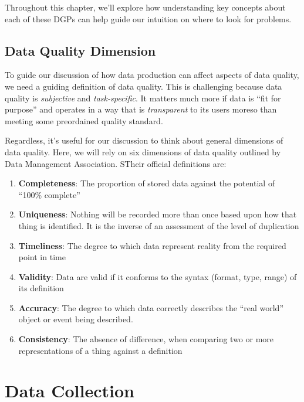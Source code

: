 \documentclass[
]{krantz}
\providecommand{\tightlist}{%
  \setlength{\itemsep}{0pt}\setlength{\parskip}{0pt}}
\begin{document}
Throughout this chapter, we'll explore how understanding key concepts about each of these DGPs can help guide our intuition on where to look for problems.

\hypertarget{data-quality-dimension}{%
\subsection{Data Quality Dimension}\label{data-quality-dimension}}

To guide our discussion of how data production can affect aspects of data quality, we need a guiding definition of data quality.
This is challenging because data quality is \emph{subjective} and \emph{task-specific}.
It matters much more if data is ``fit for purpose'' and operates in a way that is \emph{transparent} to its users moreso than meeting some preordained quality standard.

Regardless, it's useful for our discussion to think about general dimensions of data quality. Here, we will rely on six dimensions of data quality outlined by Data Management Association.
STheir official definitions are:

\begin{enumerate}
\def\labelenumi{\arabic{enumi}.}
\tightlist
\item
  \textbf{Completeness}: The proportion of stored data against the potential of ``100\% complete''
\item
  \textbf{Uniqueness}: Nothing will be recorded more than once based upon how that thing is identified. It is the inverse of an assessment of the level of duplication
\item
  \textbf{Timeliness}: The degree to which data represent reality from the required point in time
\item
  \textbf{Validity}: Data are valid if it conforms to the syntax (format, type, range) of its definition
\item
  \textbf{Accuracy}: The degree to which data correctly describes the ``real world'' object or event
  being described.
\item
  \textbf{Consistency}: The absence of difference, when comparing two or more representations of a
  thing against a definition
\end{enumerate}

\hypertarget{data-collection}{%
\section{Data Collection}\label{data-collection}}
\end{document}
